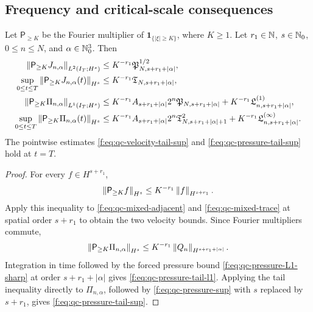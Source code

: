 \subsection{Frequency and critical-scale consequences}

\begin{proposition}
\label{f:prop:qc-frequency-tails}
Let \(\mathsf P_{\ge K}\) be the Fourier multiplier of
\(\mathbf 1_{\{|\xi|\ge K\}}\), where \(K\ge1\).  Let
\(r_1\in\mathbb N\), \(s\in\mathbb N_0\), \(0\le n\le N\), and
\(\alpha\in\mathbb N_0^3\).  Then
\begin{align}
 \left\lVert \mathsf P_{\ge K}J_{n,\alpha}\right\rVert_{L^2(I_T;H^s)}
 &\le K^{-r_1}\mathfrak P_{N,s+r_1+|\alpha|}^{1/2},
 \label{f:eq:qc-velocity-tail-l2}\\
 \sup_{0\le t\le T}
 \left\lVert \mathsf P_{\ge K}J_{n,\alpha}(t)\right\rVert_{H^s}
 &\le K^{-r_1}\mathfrak T_{N,s+r_1+|\alpha|},
 \label{f:eq:qc-velocity-tail-sup}\\
 \left\lVert \mathsf P_{\ge K}\Pi_{n,\alpha}\right\rVert_{L^1(I_T;H^s)}
 &\le K^{-r_1}A_{s+r_1+|\alpha|}2^n
 \mathfrak P_{N,s+r_1+|\alpha|}
 +K^{-r_1}\mathfrak L^{(1)}_{n,s+r_1+|\alpha|},
 \label{f:eq:qc-pressure-tail-l1}\\
 \sup_{0\le t\le T}
 \left\lVert \mathsf P_{\ge K}\Pi_{n,\alpha}(t)\right\rVert_{H^s}
 &\le K^{-r_1}A_{s+r_1+|\alpha|}2^n
 \mathfrak T_{N,s+r_1+|\alpha|+1}^2
 +K^{-r_1}\mathfrak L^{(\infty)}_{n,s+r_1+|\alpha|}.
 \label{f:eq:qc-pressure-tail-sup}
\end{align}
The pointwise estimates \eqref{f:eq:qc-velocity-tail-sup} and
\eqref{f:eq:qc-pressure-tail-sup} hold at \(t=T\).
\end{proposition}

\begin{proof}
For every \(f\in H^{s+r_1}\),
\[
 \left\lVert \mathsf P_{\ge K}f\right\rVert_{H^s}
 \le K^{-r_1}\left\lVert f\right\rVert_{H^{s+r_1}}.
\]
Apply this inequality to
\eqref{f:eq:qc-mixed-adjacent} and \eqref{f:eq:qc-mixed-trace} at spatial order
\(s+r_1\) to obtain the two velocity bounds.  Since Fourier multipliers
commute,
\[
 \left\lVert \mathsf P_{\ge K}\Pi_{n,\alpha}\right\rVert_{H^s}
 \le K^{-r_1}\left\lVert Q_n\right\rVert_{H^{s+r_1+|\alpha|}}.
\]
Integration in time followed by
the forced pressure bound \eqref{f:eq:qc-pressure-L1-sharp} at order
\(s+r_1+|\alpha|\) gives
\eqref{f:eq:qc-pressure-tail-l1}.  Applying the tail inequality directly to
\(\Pi_{n,\alpha}\), followed by \eqref{f:eq:qc-pressure-sup} with \(s\) replaced
by \(s+r_1\), gives \eqref{f:eq:qc-pressure-tail-sup}.
\end{proof}

